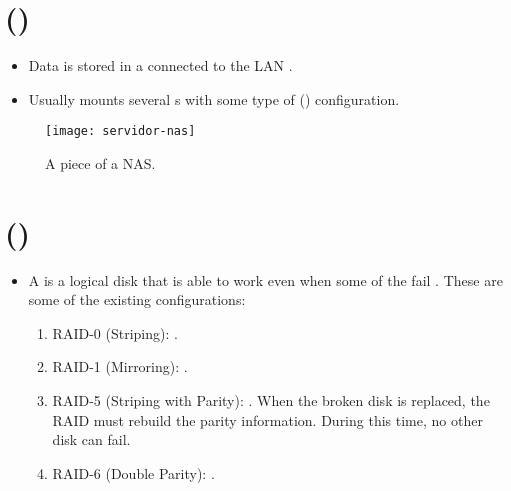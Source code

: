 \section{ ()}
\begin{itemize}
\item Data is stored in a 
  connected to the \gls{LAN} \cite{wikipedia_NAS}.
\item Usually mounts several s with some type of
   () configuration.
\end{itemize}
\begin{figure}[H]
  \vspace{-1ex}
  \centering
  \texttt{[image: servidor-nas]}
  \caption{A piece of a \gls{NAS}.}
  \label{fig:NAS}
\end{figure}

\section{ ()}
\begin{itemize}
\item A  is a logical disk that is able to work even when
  some of the 
  fail \cite{wikipedia_RAID}. These are some of the existing configurations:
  \begin{enumerate}
  \item RAID-0 (Striping): .
  \item RAID-1 (Mirroring): .
  \item RAID-5 (Striping with Parity): . When the broken disk is replaced, the RAID must
    rebuild the parity information. During this time, no other disk
    can fail.
  \item RAID-6 (Double Parity): .
  \end{enumerate}
\end{itemize}

